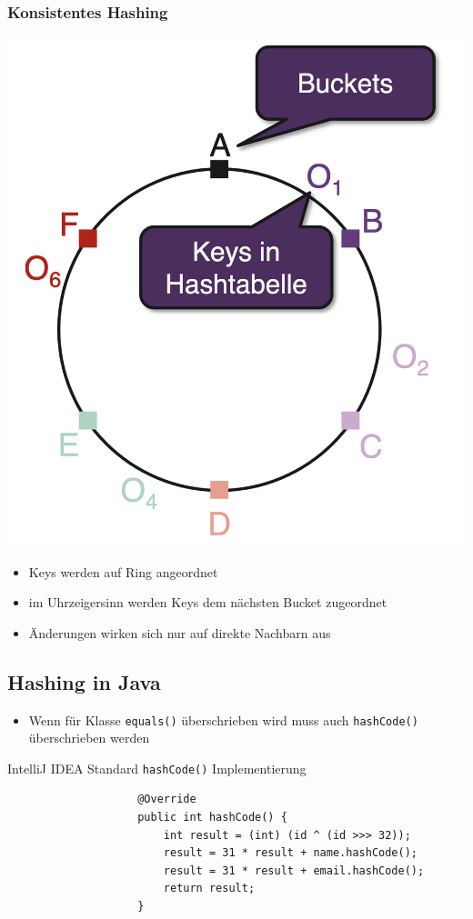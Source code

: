 \documentclass[a4paper, landscape, 8pt]{scrartcl}
\begin{document}
\begin{multicols*}{4}
                \subsubsection{Konsistentes Hashing}
                    \includegraphics[scale=0.15]{graphic/16_konsistentes_hashing_ring}
                    \begin{itemize}
                        \item Keys werden auf Ring angeordnet
                        \item im Uhrzeigersinn werden Keys dem nächsten Bucket zugeordnet
                        \item Änderungen wirken sich nur auf direkte Nachbarn aus
                    \end{itemize}
        
            \subsection{Hashing in Java}
                \begin{itemize}
                    \item Wenn für Klasse \texttt{equals()} überschrieben wird muss auch \texttt{hashCode()}
                    überschrieben werden
                \end{itemize}
                \textcolor{subsectioncolor}{IntelliJ IDEA Standard \texttt{hashCode()} Implementierung}
                \begin{lstlisting}
                    @Override
                    public int hashCode() {
                        int result = (int) (id ^ (id >>> 32));
                        result = 31 * result + name.hashCode();
                        result = 31 * result + email.hashCode();
                        return result;
                    }
                \end{lstlisting}

\end{multicols*}
\end{document}
